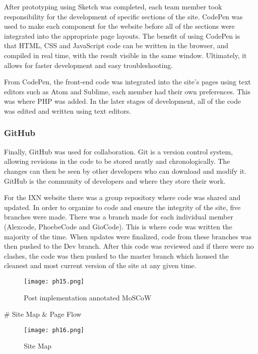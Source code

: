 \documentclass[fontsize=10pt]{extarticle}
\numberwithin{figure}{section} %
\begin{document}
After prototyping using Sketch was completed, each team member took
responsibility for the development of specific sections of the site.
CodePen was used to make each component for the website before all of
the sections were integrated into the appropriate page layouts. The
benefit of using CodePen is that HTML, CSS and JavaScript code can be
written in the browser, and compiled in real time, with the result
visible in the same window. \cite{p19} Ultimately, it allows for faster
development and easy troubleshooting.

From CodePen, the front-end code was integrated into the site's pages
using text editors such as Atom and Sublime, each member had their own
preferences. This was where PHP was added. In the later stages of
development, all of the code was edited and written using text editors.

\hypertarget{github}{%
\subsubsection{GitHub}\label{github}}

Finally, GitHub was used for collaboration. Git is a version control
system, allowing revisions in the code to be stored neatly and
chronologically. The changes can then be seen by other developers who
can download and modify it. \cite{p20} GitHub is the community of
developers and where they store their work.

For the IXN website there was a group repository where code was shared
and updated. In order to organize to code and ensure the integrity of
the site, five branches were made. There was a branch made for each
individual member (Alexcode, PhoebeCode and GioCode). This is where code
was written the majority of the time. When updates were finalized, code
from these branches was then pushed to the Dev branch. After this code
was reviewed and if there were no clashes, the code was then pushed to
the master branch which housed the cleanest and most current version of
the site at any given time.

\begin{figure}[H]
      \centering
      \texttt{[image: ph15.png]}
      \caption{Post implementation annotated MoSCoW}
 \end{figure}

\# Site Map \& Page Flow

\begin{figure}[H]
      \centering
      \texttt{[image: ph16.png]}
      \caption{Site Map}
 \end{figure}
\end{document}
